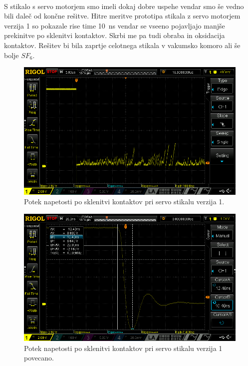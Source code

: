 \documentclass[a4paper,twoside,openright,12pt,slovene]{book}
\begin{document}
    ~\\S stikalo s servo motorjem smo imeli dokaj dobre uspehe vendar smo še vedno bili daleč od končne rešitve. Hitre meritve prototipa stikala z servo motorjem verzija 1 so pokazale rise time  \SI{10}{\nano\second} vendar se vseeno pojavljajo manjše prekinitve po sklenitvi kontaktov. Skrbi me pa tudi obraba in oksidacija kontaktov. Rešitev bi bila zaprtje celotnega stikala v vakumsko komoro ali še bolje $SF_{6}$.
    
    \begin{figure}[H]
        \centering
        \includegraphics[width=1\columnwidth]{Slike/ServoStikalo1/ServoStikalo1.png}
        \caption{\label{ServoStikalo1} Potek napetosti po sklenitvi kontaktov pri servo stikalu verzija 1.}
    \end{figure}
    
    \begin{figure}[H]
        \centering
        \includegraphics[width=1\columnwidth]{Slike/ServoStikalo1/ServoStikalo1povecano.png}
        \caption{\label{ServoStikalo1povecano} Potek napetosti po sklenitvi kontaktov pri servo stikalu verzija 1 povecano.}
    \end{figure}
    
\end{document}
